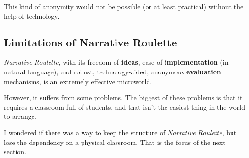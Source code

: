 This kind of anonymity would not be possible (or at least practical)
without the help of technology.

\subsection{Limitations of Narrative Roulette}

\emph{Narrative Roulette}, with its freedom of \textbf{ideas}, ease of \textbf{implementation} (in natural language), and robust, technology-aided, anonymous \textbf{evaluation} mechanisms, is an extremely effective microworld. 

However, it suffers from some problems. The biggest of these problems is that it requires a classroom full of students, and that isn't the easiest thing in the world to arrange. 

I wondered if there was a way to keep the structure of \emph{Narrative Roulette}, but lose the dependency on a physical classroom. That is the focus of the next section.   
